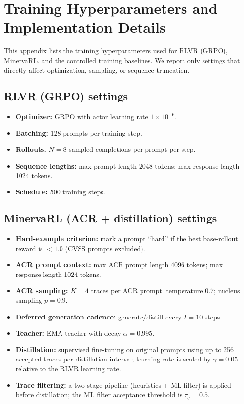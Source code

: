 \section{Training Hyperparameters and Implementation Details}
\label{app:training-settings}

This appendix lists the training hyperparameters used for RLVR (GRPO), MinervaRL, and the controlled training baselines. We report only settings that directly affect optimization, sampling, or sequence truncation.

\subsection{RLVR (GRPO) settings}
\begin{itemize}
  \item \textbf{Optimizer:} GRPO with actor learning rate $1\times 10^{-6}$.
  \item \textbf{Batching:} 128 prompts per training step.
  \item \textbf{Rollouts:} $N=8$ sampled completions per prompt per step.
  \item \textbf{Sequence lengths:} max prompt length 2048 tokens; max response length 1024 tokens.
  \item \textbf{Schedule:} 500 training steps.
\end{itemize}

\subsection{MinervaRL (ACR + distillation) settings}
\begin{itemize}
  \item \textbf{Hard-example criterion:} mark a prompt ``hard'' if the best base-rollout reward is $<1.0$ (CVSS prompts excluded).
  \item \textbf{ACR prompt context:} max ACR prompt length 4096 tokens; max response length 1024 tokens.
  \item \textbf{ACR sampling:} $K=4$ traces per ACR prompt; temperature $0.7$; nucleus sampling $p=0.9$.
  \item \textbf{Deferred generation cadence:} generate/distill every $I=10$ steps.
  \item \textbf{Teacher:} EMA teacher with decay $\alpha=0.995$.
  \item \textbf{Distillation:} supervised fine-tuning on original prompts using up to 256 accepted traces per distillation interval; learning rate is scaled by $\gamma=0.05$ relative to the RLVR learning rate.
  \item \textbf{Trace filtering:} a two-stage pipeline (heuristics + ML filter) is applied before distillation; the ML filter acceptance threshold is $\tau_q=0.5$.
\end{itemize}

